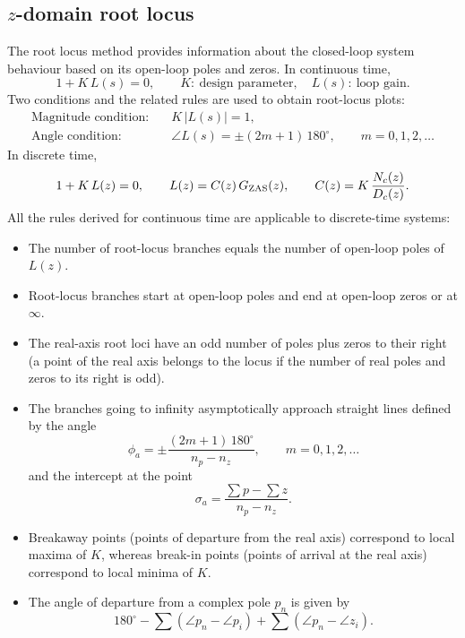 \subsection{$z$-domain root locus}
The root locus method provides information about the closed-loop system behaviour based on its open-loop
poles and zeros. In continuous time,
\[
  1+K\,L(s)=0,\qquad K:\ \text{design parameter},\quad L(s):\ \text{loop gain.}
\]
Two conditions and the related rules are used to obtain root-locus plots:
\begin{align*}
  \text{Magnitude condition:}&\quad K\,|L(s)|=1,\\
  \text{Angle condition:}&\quad \angle L(s)=\pm(2m+1)\,180^{\circ},\qquad m=0,1,2,\dots
\end{align*}
In discrete time,
\begin{equation}
  1+K\,L(z)=0,\qquad L(z)=C(z)\,G_{\mathrm{ZAS}}(z),\qquad C(z)=K\,\frac{N_c(z)}{D_c(z)}.
\end{equation}
All the rules derived for continuous time are applicable to discrete-time systems:
\begin{itemize}
  \item The number of root-locus branches equals the number of open-loop poles of $L(z)$.
  \item Root-locus branches start at open-loop poles and end at open-loop zeros or at $\infty$.
  \item The real-axis root loci have an odd number of poles plus zeros to their right (a point of the real
        axis belongs to the locus if the number of real poles and zeros to its right is odd).
\end{itemize}
\begin{itemize}
  \item The branches going to infinity asymptotically approach straight lines defined by the angle
  \begin{equation}
    \phi_a=\pm\frac{(2m+1)\,180^{\circ}}{n_p-n_z},\qquad m=0,1,2,\dots
  \end{equation}
  and the intercept at the point
  \begin{equation}
    \sigma_a=\frac{\sum p-\sum z}{n_p-n_z}.
  \end{equation}
  \item Breakaway points (points of departure from the real axis) correspond to local maxima of $K$, whereas
  break-in points (points of arrival at the real axis) correspond to local minima of $K$.
  \item The angle of departure from a complex pole $p_n$ is given by
  \[
    180^{\circ}-\sum(\angle p_n-\angle p_i)+\sum(\angle p_n-\angle z_i).
  \]
\end{itemize}

